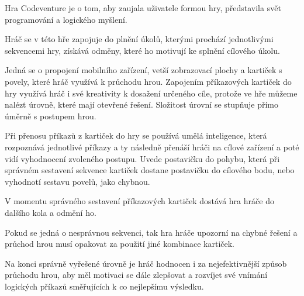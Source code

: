 Hra Codeventure je o tom, aby zaujala uživatele formou hry, představila svět programování a logického myšlení.\par
Hráč se v této hře zapojuje do plnění úkolů, kterými prochází jednotlivými sekvencemi hry, získává odměny, které ho motivují ke splnění cílového úkolu.\par Jedná se o propojení mobilního zařízení, vetší zobrazovací plochy a kartiček s povely, které hráč využívá k průchodu hrou. Zapojením příkazových kartiček do hry využívá hráč i své kreativity k dosažení určeného cíle, protože ve hře můžeme nalézt úrovně, které mají otevřené řešení. Složitost úrovní se stupňuje přímo úměrně s postupem hrou.\par Při přenosu příkazů z kartiček do hry se používá umělá inteligence, která rozpoznává jednotlivé příkazy a ty následně přenáší hráči na cílové zařízení a poté vidí vyhodnocení zvoleného postupu. Uvede postavičku do pohybu, která při správném sestavení sekvence kartiček dostane postavičku do cílového bodu, nebo vyhodnotí sestavu povelů, jako chybnou.\par
V momentu správného sestavení příkazových kartiček dostává hra hráče do dalšího kola a odmění ho.\par Pokud se jedná o nesprávnou sekvenci, tak hra hráče upozorní na chybné řešení a průchod hrou musí opakovat za použití jiné kombinace kartiček.\par Na konci správně vyřešené úrovně je hráč hodnocen i za nejefektivnější způsob průchodu hrou, aby měl motivaci se dále zlepšovat a rozvíjet své vnímání logických příkazů směřujících k co nejlepšímu výsledku.